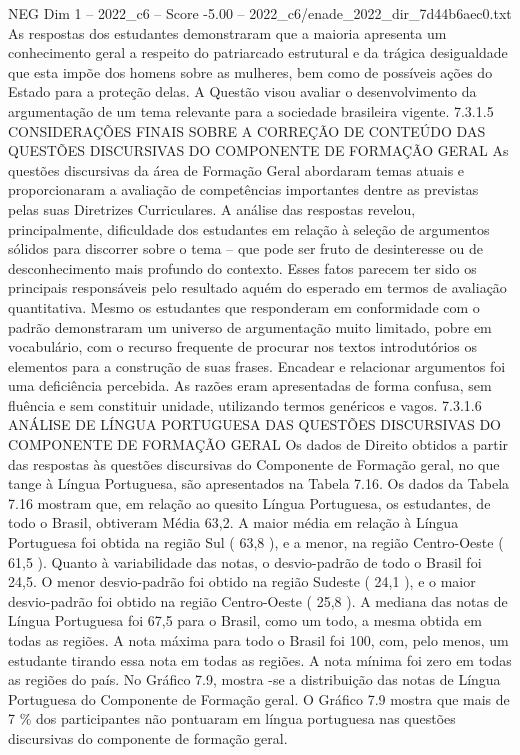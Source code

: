 \begin{textsample}{NEG Dim 1 – 2022\_c6 – Score -5.00 – 2022\_c6/enade\_2022\_dir\_7d44b6aec0.txt}
As respostas dos estudantes demonstraram que a maioria apresenta um conhecimento geral a respeito do patriarcado estrutural e da trágica desigualdade que esta impõe dos homens sobre as mulheres, bem como de possíveis ações do Estado para a proteção delas.
A Questão visou avaliar o desenvolvimento da argumentação de um tema relevante para a sociedade brasileira vigente. 7.3.1.5 CONSIDERAÇÕES FINAIS SOBRE A CORREÇÃO DE CONTEÚDO DAS QUESTÕES DISCURSIVAS DO COMPONENTE DE FORMAÇÃO GERAL As questões discursivas da área de Formação Geral abordaram temas atuais e proporcionaram a avaliação de competências importantes dentre as previstas pelas suas Diretrizes Curriculares.
A análise das respostas revelou, principalmente, dificuldade dos estudantes em relação à seleção de argumentos sólidos para discorrer sobre o tema – que pode ser fruto de desinteresse ou de desconhecimento mais profundo do contexto.
Esses fatos parecem ter sido os principais responsáveis pelo resultado aquém do esperado em termos de avaliação quantitativa.
Mesmo os estudantes que responderam em conformidade com o padrão demonstraram um universo de argumentação muito limitado, pobre em vocabulário, com o recurso frequente de procurar nos textos introdutórios os elementos para a construção de suas frases.
Encadear e relacionar argumentos foi uma deficiência percebida.
As razões eram apresentadas de forma confusa, sem fluência e sem constituir unidade, utilizando termos genéricos e vagos. 7.3.1.6 ANÁLISE DE LÍNGUA PORTUGUESA DAS QUESTÕES DISCURSIVAS DO COMPONENTE DE FORMAÇÃO GERAL Os dados de Direito obtidos a partir das respostas às questões discursivas do Componente de Formação geral, no que tange à Língua Portuguesa, são apresentados na Tabela 7.16.
Os dados da Tabela 7.16 mostram que, em relação ao quesito Língua Portuguesa, os estudantes, de todo o Brasil, obtiveram Média 63,2.
A maior média em relação à Língua Portuguesa foi obtida na região Sul ( 63,8 ), e a menor, na região Centro-Oeste ( 61,5 ).
Quanto à variabilidade das notas, o desvio-padrão de todo o Brasil foi 24,5.
O menor desvio-padrão foi obtido na região Sudeste ( 24,1 ), e o maior desvio-padrão foi obtido na região Centro-Oeste ( 25,8 ).
A mediana das notas de Língua Portuguesa foi 67,5 para o Brasil, como um todo, a mesma obtida em todas as regiões.
A nota máxima para todo o Brasil foi 100, com, pelo menos, um estudante tirando essa nota em todas as regiões.
A nota mínima foi zero em todas as regiões do país.
No Gráfico 7.9, mostra -se a distribuição das notas de Língua Portuguesa do Componente de Formação geral.
O Gráfico 7.9 mostra que mais de 7 \% dos participantes não pontuaram em língua portuguesa nas questões discursivas do componente de formação geral.

\end{textsample}
